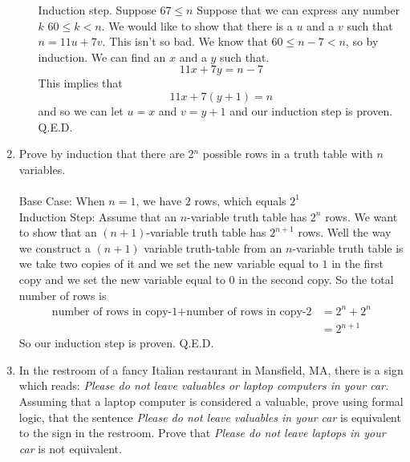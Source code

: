 \documentclass[12pt]{amsart}
\begin{document}
\begin{enumerate}
\begin{enumerate}
    Induction step. Suppose $67 \le n$ Suppose that we can express any number $k$
    $60 \le k < n$. We would like to show that there is
    a $u$ and a $v$ such that $n = 11 u + 7 v$.
    This isn't so bad. We know that $60 \le n - 7 < n$, so by induction.
    We can find an $x$ and a $y$ such that.
    \[
    11 x + 7 y = n - 7
    \]
    This implies that
    \[
    11 x + 7( y + 1) = n
    \]
    and so we can let $u = x$ and $v = y +1$ and our induction
    step is proven.
    Q.E.D.
    \end{enumerate}
\item Prove by induction that there are 2$^{\mathit{n}}$ possible
      rows in a truth table with  $ n$ variables.\\
    \\
    Base Case: When $n= 1$, we have $2$ rows, which equals $2^1$\\
    Induction Step: Assume that an $n$-variable truth table has
    $2^n$ rows. We want to show that an $(n+1)$-variable truth
    table has $2^{n+1}$ rows. Well the way we construct a $(n+1)$
    variable truth-table from an $n$-variable truth table is we
    take two copies of it and we set the new variable equal
    to $1$ in the first copy and we set the new variable equal
    to $0$ in the second copy. So the total number of rows
    is
    \begin{align*}
    \text{number of rows in copy-1} + \text{number of rows in copy-2}
    &= 2^n + 2^n \\
    &= 2^{n+1}
    \end{align*}
    So our induction step is proven. Q.E.D.

\item   In the restroom of a fancy Italian restaurant in Mansfield,
        MA, there is a sign which reads:  {\em Please do not leave
        valuables or laptop computers in your car.}\\
        Assuming that a laptop computer is considered a valuable, prove
        using formal logic, that the sentence  {\em Please do not leave
        valuables in your car} is equivalent to the sign in the restroom.
        Prove that  {\em Please do not leave laptops in your car} is not
        equivalent. \\


\end{enumerate}
\end{document}
